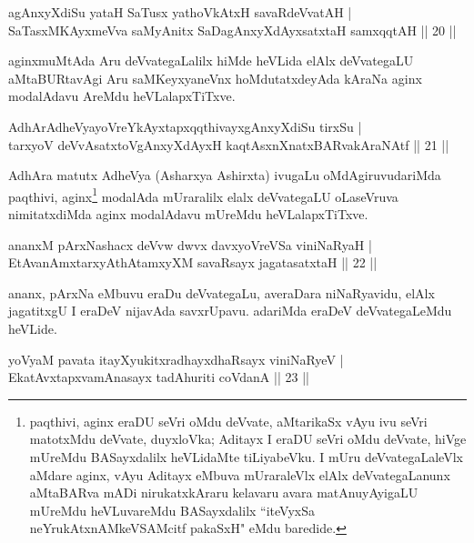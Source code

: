 \begin{shl}
agAnxyXdiSu yataH SaTusx yathoVkAtxH savaRdeVvatAH |\\
SaTasxMKAyxmeVva saMyAnitx SaDagAnxyXdAyxsatxtaH samxqqtAH \hfill || 20 ||
\end{shl}

\begin{artha}
aginxmuMtAda Aru deVvategaLalilx hiMde heVLida elAlx deVvategaLU aMtaBURtavAgi Aru saMKeyxyaneVnx hoMdutatxdeyAda kAraNa aginx modalAdavu AreMdu heVLalapxTiTxve.
\end{artha}


\begin{shl}
AdhArAdheVyayoVreYkAyxtapxqqthivayxgAnxyXdiSu tirxSu |\\
tarxyoV deVvAsatxtoV\s gAnxyXdAyxH kaqtAsxnXnatxBARvakAraNAtf \hfill || 21 ||
\end{shl}

\begin{artha}
AdhAra matutx AdheVya (Asharxya Ashirxta) ivugaLu oMdAgiruvudariMda paqthivi, aginx\footnote{paqthivi, aginx eraDU seVri oMdu deVvate, aMtarikaSx vAyu ivu seVri matotxMdu deVvate, duyxloVka; Aditayx I eraDU seVri oMdu deVvate, hiVge mUreMdu BASayxdalilx heVLidaMte tiLiyabeVku. I mUru deVvategaLaleVlx aMdare aginx, vAyu Aditayx eMbuva mUraraleVlx elAlx deVvategaLanunx aMtaBARva mADi nirukatxkAraru kelavaru avara matAnuyAyigaLU mUreMdu heVLuvareMdu BASayxdalilx ``iteVyxSa neYrukAtxnAMkeVSAMcitf pakaSxH" eMdu baredide.} modalAda mUraralilx elalx deVvategaLU oLaseVruva nimitatxdiMda aginx modalAdavu mUreMdu heVLalapxTiTxve.
\end{artha}


\begin{shl}
ananxM pArxNashacx deVvw dwvx davxyoVreVSa viniNaRyaH |\\
EtAvanAmxtarxyAthAtamxyXM savaRsayx jagatasatxtaH \hfill || 22 ||
\end{shl}

\begin{artha}
ananx, pArxNa eMbuvu eraDu deVvategaLu, averaDara niNaRyavidu, elAlx jagatitxgU I eraDeV nijavAda savxrUpavu. adariMda eraDeV deVvategaLeMdu heVLide.
\end{artha}

\begin{shl}
yoV\s yaM pavata itayXyukitxradhayxdhaRsayx viniNaRyeV |\\
EkatAvxtapxvamAnasayx tadAhuriti coVdanA \hfill || 23 ||
\end{shl}

